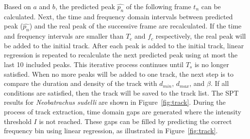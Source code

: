 Based on $a$ and $b$, the predicted peak $\hat{p_{n}}$ of the following frame $t_{n}$ can be calculated. 
Next, the time and frequency domain intervals between predicted peak ($\hat{p_{n}}$) and the real peak of the successive frame are recalculated. If the time and frequency intervals are smaller than $T_{c}$ and $f_{c}$ respectively, the real peak will be added to the initial track. After each peak is added to the initial track, linear regression is repeated to recalculate the next predicted peak using at most the last 10 included peaks. This iterative process continues until $T_{s}$ is no longer satisfied. 
When no more peaks will be added to one track, the next step is to compare the duration and density of the track with $d_{min}$, $d_{max}$, and $\beta$. If all conditions are satisfied, then the track will be saved to the track list. The SPT results for \textit{Neobatrachus sudelli} are shown in
Figure~\ref{fig:track}. During the process of track extraction, time domain gaps  are generated where the intensity threshold $I$ is not reached.
These gaps can be filled by predicting the correct frequency
bin using linear regression, as illustrated in Figure~\ref{fig:track}. 

